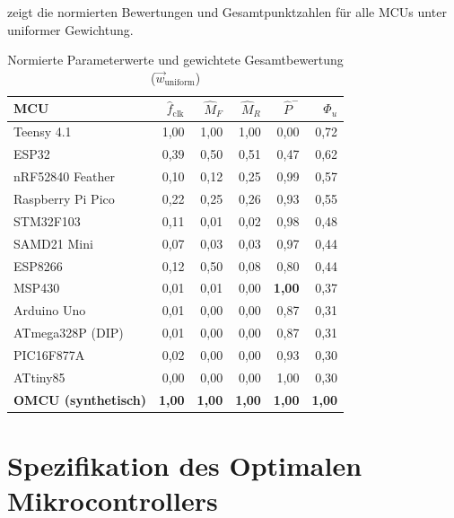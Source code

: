 ﻿\documentclass[12pt, a4paper]{article}
\theoremstyle{plain}
\theoremstyle{definition}
\theoremstyle{remark}
\begin{document}
 zeigt die normierten Bewertungen und
Gesamtpunktzahlen für alle MCUs unter uniformer Gewichtung.

\begin{table}[H]
  \centering
  \caption{Normierte Parameterwerte und gewichtete Gesamtbewertung ($\vec{w}_\text{uniform}$)}
  \label{tab:scores}
  \small
  \begin{tabular}{lrrrrr}
    \toprule
    \textbf{MCU} & $\hat{f}_\text{clk}$ & $\hat{M}_F$ & $\hat{M}_R$ &
    $\hat{P}^{-}$ & $\Phi_u$ \\
    \midrule
    Teensy 4.1       & 1,00 & 1,00 & 1,00 & 0,00 & 0,72 \\
    ESP32            & 0,39 & 0,50 & 0,51 & 0,47 & 0,62 \\
    nRF52840 Feather & 0,10 & 0,12 & 0,25 & 0,99 & 0,57 \\
    Raspberry Pi Pico& 0,22 & 0,25 & 0,26 & 0,93 & 0,55 \\
    STM32F103        & 0,11 & 0,01 & 0,02 & 0,98 & 0,48 \\
    SAMD21 Mini      & 0,07 & 0,03 & 0,03 & 0,97 & 0,44 \\
    ESP8266          & 0,12 & 0,50 & 0,08 & 0,80 & 0,44 \\
    MSP430           & 0,01 & 0,01 & 0,00 & \textbf{1,00} & 0,37 \\
    Arduino Uno      & 0,01 & 0,00 & 0,00 & 0,87 & 0,31 \\
    ATmega328P (DIP) & 0,01 & 0,00 & 0,00 & 0,87 & 0,31 \\
    PIC16F877A       & 0,02 & 0,00 & 0,00 & 0,93 & 0,30 \\
    ATtiny85         & 0,00 & 0,00 & 0,00 & 1,00 & 0,30 \\
    \midrule
    \textbf{OMCU (synthetisch)} & \textbf{1,00} & \textbf{1,00} & \textbf{1,00} &
    \textbf{1,00} & \textbf{1,00} \\
    \bottomrule
  \end{tabular}
\end{table}

\section{Spezifikation des Optimalen Mikrocontrollers}
\label{sec:omcu}
\end{document}
